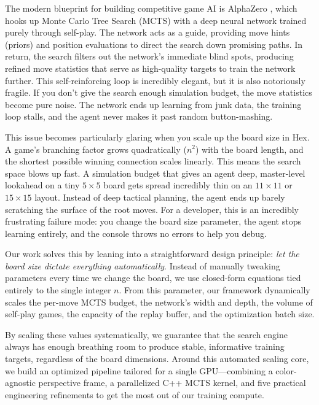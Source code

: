 \documentclass[conference]{IEEEtran}
\begin{document}
The modern blueprint for building competitive game AI is AlphaZero \cite{silver2018general}, which hooks up Monte Carlo Tree Search (MCTS) with a deep neural network trained purely through self-play. The network acts as a guide, providing move hints (priors) and position evaluations to direct the search down promising paths. In return, the search filters out the network's immediate blind spots, producing refined move statistics that serve as high-quality targets to train the network further. This self-reinforcing loop is incredibly elegant, but it is also notoriously fragile. If you don't give the search enough simulation budget, the move statistics become pure noise. The network ends up learning from junk data, the training loop stalls, and the agent never makes it past random button-mashing.

This issue becomes particularly glaring when you scale up the board size in Hex. A game's branching factor grows quadratically ($n^2$) with the board length, and the shortest possible winning connection scales linearly. This means the search space blows up fast. A simulation budget that gives an agent deep, master-level lookahead on a tiny $5 \times 5$ board gets spread incredibly thin on an $11 \times 11$ or $15 \times 15$ layout. Instead of deep tactical planning, the agent ends up barely scratching the surface of the root moves. For a developer, this is an incredibly frustrating failure mode: you change the board size parameter, the agent stops learning entirely, and the console throws no errors to help you debug.

Our work solves this by leaning into a straightforward design principle: \emph{let the board size dictate everything automatically}. Instead of manually tweaking parameters every time we change the board, we use closed-form equations tied entirely to the single integer $n$. From this parameter, our framework dynamically scales the per-move MCTS budget, the network's width and depth, the volume of self-play games, the capacity of the replay buffer, and the optimization batch size.

By scaling these values systematically, we guarantee that the search engine always has enough breathing room to produce stable, informative training targets, regardless of the board dimensions. Around this automated scaling core, we build an optimized pipeline tailored for a single GPU---combining a color-agnostic perspective frame, a parallelized C++ MCTS kernel, and five practical engineering refinements to get the most out of our training compute.
\end{document}
